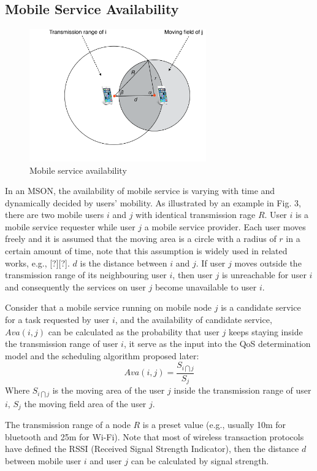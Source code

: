 \documentclass[10pt,journal,compsoc]{IEEEtran}
\begin{document}
\subsection{Mobile Service Availability}
\begin{figure}[!t]
\centering
\includegraphics[width=3in]{./img/pic3.pdf}
\caption{Mobile service availability}
\label{fig_sd}
\end{figure}
In an MSON, the availability of mobile service is varying with time and dynamically decided by users' mobility. 
As illustrated by an example in Fig. 3, there are two mobile users $i$ and $j$ with identical transmission rage $R$. User $i$ is a mobile service requester while user $j$ a mobile service provider. Each user moves freely and it is assumed that the moving area is a circle with a radius of $r$ in a certain amount of time, note that this assumption is widely used in related works, e.g., [?][?]. $d$ is the distance between $i$ and $j$. If user $j$ moves outside the transmission range of its neighbouring user $i$, then user $j$ is unreachable for user $i$ and consequently the services on user $j$ become unavailable to user $i$.

Consider that a mobile service running on mobile node $j$ is a candidate service for a task requested by user $i$, and the availability of candidate service, $Ava(i,j)$ can be calculated as the probability that user $j$ keeps staying inside the transmission range of user $i$, it serve as the input into the QoS determination model and the scheduling algorithm proposed later:
\begin{equation}
Ava(i,j) = \frac{S_{i \bigcap j}}{S_j}
\end{equation}
Where $S_{i \bigcap j}$ is the moving area of the user $j$ inside the transmission range of user $i$, $S_j$ the moving field area of the user $j$.

The transmission range of a node $R$ is a preset value (e.g., usually 10m for bluetooth and 25m for Wi-Fi). 
Note that most of wireless transaction protocols have defined the RSSI (Received Signal Strength Indicator), then the distance $d$ between mobile user $i$ and user $j$ can be calculated by signal strength.
\end{document}
